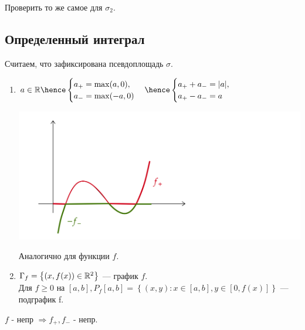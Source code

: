 \begin{exercise}
    Проверить то же самое для $\sigma_2$.
\end{exercise}



 \newpage

\subsection{Определенный интеграл}

Считаем, что зафиксирована псевдоплощадь $\sigma$.


\begin{definition}
    \begin{enumerate}
        \item $
        a \in \R \hence \begin{cases}
            a_+ = \max(a, 0),\\ a_- = \max(-a, 0) 
        \end{cases} \hence \begin{cases}
            a_+ + a_- = |a|,\\ a_+ - a_- = a
        \end{cases}
    $

    \includegraphics[width=5.0in]{images/diagram-20220612.png}

    Аналогично для функции $f$. 
        \item  $\Gamma_f = \left\{(x, f(x)) \in \mathbb{R}^2\right\}$ --- график $f$.\\
        Для $f \geqslant 0$ на $[a, b], P_f[a, b] = \left\{ (x, y) : x \in [a, b], y \in [0, f(x)]\right\}$ --- подграфик f.
    
    \end{enumerate}
    
   \end{definition}

\begin{remark}
    $f$ - непр $\Rightarrow f_+, f_-$ - непр.
\end{remark}

